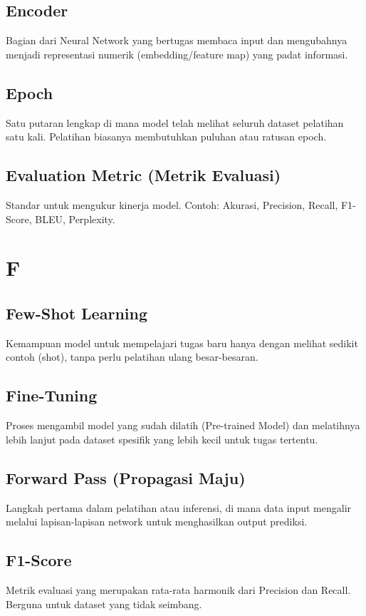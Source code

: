 \subsection*{Encoder}
Bagian dari Neural Network yang bertugas membaca input dan mengubahnya menjadi representasi numerik (embedding/feature map) yang padat informasi.

\subsection*{Epoch}
Satu putaran lengkap di mana model telah melihat seluruh dataset pelatihan satu kali. Pelatihan biasanya membutuhkan puluhan atau ratusan epoch.

\subsection*{Evaluation Metric (Metrik Evaluasi)}
Standar untuk mengukur kinerja model. Contoh: Akurasi, Precision, Recall, F1-Score, BLEU, Perplexity.

\section*{F}

\subsection*{Few-Shot Learning}
Kemampuan model untuk mempelajari tugas baru hanya dengan melihat sedikit contoh (shot), tanpa perlu pelatihan ulang besar-besaran.

\subsection*{Fine-Tuning}
Proses mengambil model yang sudah dilatih (Pre-trained Model) dan melatihnya lebih lanjut pada dataset spesifik yang lebih kecil untuk tugas tertentu.

\subsection*{Forward Pass (Propagasi Maju)}
Langkah pertama dalam pelatihan atau inferensi, di mana data input mengalir melalui lapisan-lapisan network untuk menghasilkan output prediksi.

\subsection*{F1-Score}
Metrik evaluasi yang merupakan rata-rata harmonik dari Precision dan Recall. Berguna untuk dataset yang tidak seimbang.

